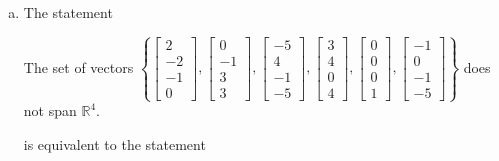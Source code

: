 \begin{exerciseAnswer}
\begin{enumerate}[(a)]
\item The statement 
\begin{center}\begin{minipage}{0.8\textwidth}
 The set of vectors \( \left\{ \left[\begin{array}{c}
2 \\
-2 \\
-1 \\
0
\end{array}\right] , \left[\begin{array}{c}
0 \\
-1 \\
3 \\
3
\end{array}\right] , \left[\begin{array}{c}
-5 \\
4 \\
-1 \\
-5
\end{array}\right] , \left[\begin{array}{c}
3 \\
4 \\
0 \\
4
\end{array}\right] , \left[\begin{array}{c}
0 \\
0 \\
0 \\
1
\end{array}\right] , \left[\begin{array}{c}
-1 \\
0 \\
-1 \\
-5
\end{array}\right] \right\} \) does not span \(\mathbb{R}^4\). 
\end{minipage}\end{center}
     is equivalent to the statement 
\begin{center}\begin{minipage}{0.8\textwidth}
 The vector equation \( x_{1} \left[\begin{array}{c}
2 \\
-2 \\
-1 \\
0
\end{array}\right] + x_{2} \left[\begin{array}{c}
0 \\
-1 \\

\end{array}
\end{minipage}
\end{center}
\end{enumerate}
\end{exerciseAnswer}

